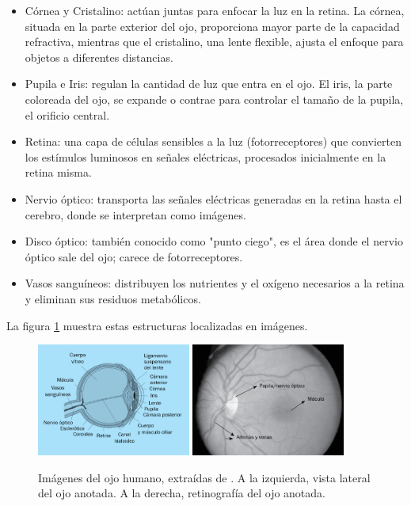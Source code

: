 \begin{itemize}
\item Córnea y Cristalino: actúan juntas para enfocar la luz en la retina. La córnea, situada en la parte exterior del ojo, proporciona mayor parte de la capacidad refractiva, mientras que el cristalino, una lente flexible, ajusta el enfoque para objetos a diferentes distancias.
\item Pupila e Iris: regulan la cantidad de luz que entra en el ojo. El iris, la parte coloreada del ojo, se expande o contrae para controlar el tamaño de la pupila, el orificio central.
\item Retina: una capa de células sensibles a la luz (fotorreceptores) que convierten los estímulos luminosos en señales eléctricas, procesados inicialmente en la retina misma.
\item Nervio óptico: transporta las señales eléctricas generadas en la retina hasta el cerebro, donde se interpretan como imágenes.
\item Disco óptico: también conocido como "punto ciego", es el área donde el nervio óptico sale del ojo; carece de fotorreceptores.
\item Vasos sanguíneos: distribuyen los nutrientes y el oxígeno necesarios a la retina y eliminan sus residuos metabólicos.
\end{itemize}

La figura \ref{fig:imaxes_ojo} muestra estas estructuras localizadas en imágenes.

\begin{figure}[tbp]
    \centering
    \includegraphics[width=0.45\textwidth]{imaxes/ojo1.png}
    \includegraphics[width=0.45\textwidth]{imaxes/ojo2.png}
    \caption{Imágenes del ojo humano, extraídas de \cite{visionyojo}. A la izquierda, vista lateral del ojo anotada. A la derecha, retinografía del ojo anotada.}
    \label{fig:imaxes_ojo}
\end{figure}

